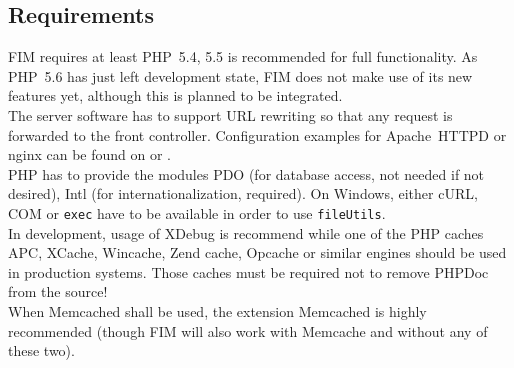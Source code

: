 \documentclass{scrartcl}
\begin{document}
   \subsection{Requirements}
      FIM requires at least PHP~5.4, 5.5 is recommended for full functionality. As PHP~5.6 has just left development state, FIM does not make use of its new features yet, although this is planned to be integrated. \\
      The server software has to support URL rewriting so that any request is forwarded to the front controller. Configuration examples for Apache~HTTPD or nginx can be found on  or . \\
      PHP has to provide the modules PDO (for database access, not needed if not desired), Intl (for internationalization, required). On Windows, either cURL, COM or \lstinline!exec! have to be available in order to use \lstinline!fileUtils!. \\
      In development, usage of XDebug is recommend while one of the PHP caches APC, XCache, Wincache, Zend cache, Opcache or similar engines should be used in production systems. Those caches must be required not to remove PHPDoc from the source! \\
      When Memcached shall be used, the extension Memcached is highly recommended (though FIM will also work with Memcache and without any of these two).
\end{document}
